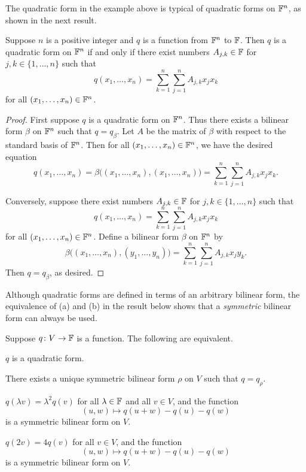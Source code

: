 The quadratic form in the example above is typical of quadratic forms on
$\mathbb{F}^n$, as shown in the next result.

\begin{result}\label{ax:9.20}
Suppose $n$ is a positive integer and $q$ is a function from $\mathbb{F}^n$ to $\mathbb{F}$.
Then $q$ is a quadratic form on $\mathbb{F}^n$ if and only if there exist numbers
$A_{j,k}\in\mathbb{F}$ for $j,k\in\{1,\dots,n\}$ such that
\[ q(x_1,\dots,x_n) = \sum_{k=1}^n\sum_{j=1}^n A_{j,k}x_jx_k \]
for all $(x_1,\dots,x_n)\in\mathbb{F}^n$.
\end{result}

\begin{proof}
First suppose $q$ is a quadratic form on $\mathbb{F}^n$. Thus there exists a bilinear
form $\beta$ on $\mathbb{F}^n$ such that $q=q_\beta$. Let $A$ be the matrix of $\beta$
with respect to the standard basis of $\mathbb{F}^n$. Then for all
$(x_1,\dots,x_n)\in\mathbb{F}^n$, we have the desired equation
\[ q(x_1,\dots,x_n) = \beta\bigl((x_1,\dots,x_n),(x_1,\dots,x_n)\bigr)
   = \sum_{k=1}^n\sum_{j=1}^n A_{j,k}x_jx_k. \]

Conversely, suppose there exist numbers $A_{j,k}\in\mathbb{F}$ for
$j,k\in\{1,\dots,n\}$ such that
\[ q(x_1,\dots,x_n) = \sum_{k=1}^n\sum_{j=1}^n A_{j,k}x_jx_k \]
for all $(x_1,\dots,x_n)\in\mathbb{F}^n$. Define a bilinear form $\beta$ on $\mathbb{F}^n$ by
\[ \beta\bigl((x_1,\dots,x_n),(y_1,\dots,y_n)\bigr)
   = \sum_{k=1}^n\sum_{j=1}^n A_{j,k}x_jy_k. \]
Then $q=q_\beta$, as desired.
\end{proof}

Although quadratic forms are defined in terms of an arbitrary bilinear form,
the equivalence of (a) and (b) in the result below shows that a
\emph{symmetric} bilinear form can always be used.

\begin{result}\label{ax:9.21}
Suppose $q\colon V\to\mathbb{F}$ is a function. The following are equivalent.
\begin{parts}
\item $q$ is a quadratic form.
\item There exists a unique symmetric bilinear form $\rho$ on $V$ such that
  $q=q_\rho$.
\item $q(\lambda v)=\lambda^2q(v)$ for all $\lambda\in\mathbb{F}$ and all $v\in V$, and
  the function
  \[ (u,w)\mapsto q(u+w)-q(u)-q(w) \]
  is a symmetric bilinear form on $V$.
\item $q(2v)=4q(v)$ for all $v\in V$, and the function
  \[ (u,w)\mapsto q(u+w)-q(u)-q(w) \]
  is a symmetric bilinear form on $V$.
\end{parts}
\end{result}

